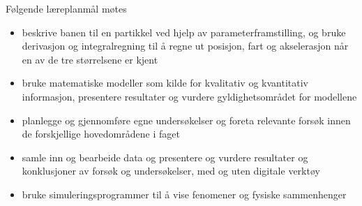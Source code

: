 \documentclass[a4paper, 11pt, notitlepage, english]{article}
\begin{document}
Følgende læreplanmål møtes
\begin{itemize}
 \item beskrive banen til en partikkel ved hjelp av parameterframstilling, og bruke derivasjon og integralregning til å regne ut posisjon, fart og akselerasjon når en av de tre størrelsene er kjent
 \item bruke matematiske modeller som kilde for kvalitativ og kvantitativ informasjon, presentere resultater og vurdere gyldighetsområdet for modellene
\item planlegge og gjennomføre egne undersøkelser og foreta relevante forsøk innen de forskjellige hovedområdene i faget
\item samle inn og bearbeide data og presentere og vurdere resultater og konklusjoner av forsøk og undersøkelser, med og uten digitale verktøy
\item bruke simuleringsprogrammer til å vise fenomener og fysiske sammenhenger
\end{itemize}
\end{document}
